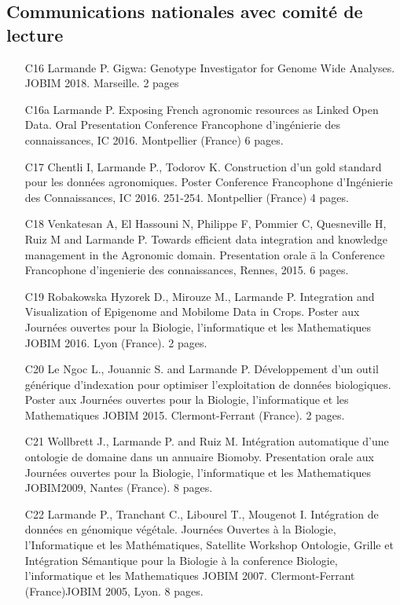 \subsection*{Communications nationales avec comité de lecture }
\begin{itemize} 
\item [C16]	 Larmande P. Gigwa: Genotype Investigator for Genome Wide Analyses. JOBIM 2018. Marseille. 2 pages
\item [C16a]	Larmande P. Exposing French agronomic resources as Linked Open Data. Oral Presentation Conference Francophone d’ingénierie des connaissances, IC 2016. Montpellier (France) 6 pages.
\item [C17]	Chentli I, Larmande P., Todorov K. Construction d’un gold standard pour les données agronomiques. Poster Conference Francophone d’Ingénierie des Connaissances, IC 2016. 251-254. Montpellier (France) 4 pages.
\item [C18]	Venkatesan A, El Hassouni N, Philippe F, Pommier C, Quesneville H, Ruiz M and Larmande P. Towards efficient data integration and knowledge management in the Agronomic domain. Presentation orale ā la Conference Francophone d’ingenierie des connaissances, Rennes, 2015. 6 pages.
\item [C19]	Robakowska Hyzorek D., Mirouze M., Larmande P. Integration and Visualization of Epigenome and Mobilome Data in Crops. Poster aux Journées ouvertes pour la Biologie, l’informatique et les Mathematiques JOBIM 2016. Lyon (France). 2 pages.
\item [C20]	Le Ngoc L., Jouannic S. and Larmande P. Développement d'un outil générique d'indexation pour optimiser l'exploitation de données biologiques. Poster aux Journées ouvertes pour la Biologie, l’informatique et les Mathematiques JOBIM 2015. Clermont-Ferrant (France). 2 pages.
\item [C21]	Wollbrett J., Larmande P. and Ruiz M. Intégration automatique d’une ontologie de domaine dans un annuaire Biomoby. Presentation orale aux Journées ouvertes pour la Biologie, l’informatique et les Mathematiques JOBIM2009, Nantes (France). 8 pages.
\item [C22]	Larmande P., Tranchant C., Libourel T., Mougenot I. Intégration de données en génomique végétale. Journées Ouvertes à la Biologie, l’Informatique et les Mathématiques, Satellite Workshop Ontologie, Grille et Intégration Sémantique pour la Biologie à la conference Biologie, l’informatique et les Mathematiques JOBIM 2007. Clermont-Ferrant (France)JOBIM 2005, Lyon. 8 pages.
\end{itemize} 




